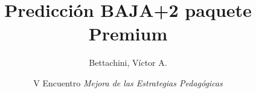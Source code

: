 \documentclass[aspectratio=43]{beamer}
\begin{document}
\title{Predicción BAJA+2 paquete Premium}
\author[bettachini@gmail.com]{Bettachini, Víctor A.}
\date[2023-09-22]{
	V Encuentro \emph{Mejora de las Estrategias Pedagógicas}%
}


\begin{frame} 
  \titlepage
\end{frame}

\end{document}

